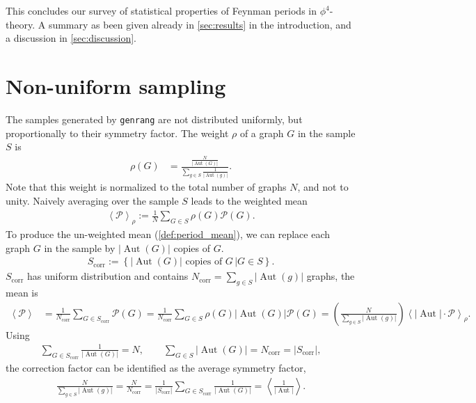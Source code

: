 \documentclass[11pt,a4paper]{article}
\newcommand{\abs}[1]{\lvert #1 \rvert}
\newcommand{\period}{\mathcal P}
\newcommand{\Aut}{\operatorname{Aut}}
\renewcommand{\|}{\rule[-0.4ex]{0.2ex}{1.2em}}
\begin{document}
\bigskip

This concludes our survey of statistical properties of Feynman periods in $\phi^4$-theory. A summary as been given already in \cref{sec:results} in the introduction, and a discussion in \cref{sec:discussion}.

\FloatBarrier





\appendix


\section{Non-uniform sampling}\label{sec:uniform_sampling}
The samples generated by \texttt{genrang} are not distributed uniformly, but proportionally to their symmetry factor. The weight $\rho$ of a graph $G$ in the sample $S$ is 
\begin{align*}
	\rho(G) &= \frac{\frac{N}{\abs{\Aut(G)}}}{\sum_{g\in S} \frac{1}{\abs{\Aut(g)}}}.
\end{align*}
Note that this weight is normalized to the total number of graphs $N$, and not to unity. Naively averaging over the sample $S$ leads to the weighted mean
\begin{align*}
	\left \langle \period \right \rangle _\rho := \frac 1 N\sum_{G\in S} \rho(G)\period(G).
\end{align*}
To produce the un-weighted mean (\cref{def:period_mean}), we can replace each graph $G$ in the sample by $\abs{\Aut(G)}$ copies of $G$. 
\begin{align}\label{def:Scorr}
S_\text{corr}:= \left \lbrace \abs{\Aut(G)}\text{ copies of }G \, \Big| G\in S \right \rbrace  .
\end{align}
$S_\text{corr}$ has uniform distribution and contains $N_\text{corr}=\sum_{g\in S}\abs{\Aut(g)}$ graphs, the mean is
\begin{align*}
	\left \langle \period \right \rangle &=  \frac{1}{ N_\text{corr} } \sum_{G\in S_\text{corr}}    \period(G) = \frac{1}{ N_\text{corr}  } \sum_{G\in S} \rho(G) \abs{\Aut(G)}  \period(G) = \left( \frac{N}{\sum_{g\in S}\abs{\Aut(g)}} \right) \left \langle \abs{\Aut } \cdot \period  \right \rangle _\rho.
\end{align*}
Using
\begin{align*}
	\sum_{G \in S_\text{corr}} \frac{1}{\abs{\Aut(G)}} = N , \qquad  \sum_{G\in S} \abs{\Aut(G)}=N_\text{corr}=\abs{S_\text{corr}},
\end{align*}
the correction factor can be identified as the average symmetry factor,
\begin{align}\label{average_symfactor}
\frac{N}{\sum_{g\in S}\abs{\Aut(g)}} =	\frac{N}{N_\text{corr}} = \frac{1}{\abs{S_\text{corr}}}\sum_{G\in S_\text{corr}} \frac{1}{\abs{\Aut(G)}} =\left \langle \frac{1}{\abs{\Aut}} \right \rangle.
\end{align}
\end{document}
